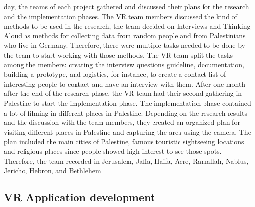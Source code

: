 day, the teams of each project gathered and discussed their plans for the research and the
implementation phases. The VR team members discussed the kind of methods to be used in
the research, the team decided on Interviews and Thinking Aloud as methods for collecting
data from random people and from Palestinians who live in Germany. Therefore, there were
multiple tasks needed to be done by the team to start working with those methods. The VR
team split the tasks among the members: creating the interview questions guideline,
documentation, building a prototype, and logistics, for instance, to create a contact list of
interesting people to contact and have an interview with them.
After one month after the end of the research phase, the VR team had their second gathering
in Palestine to start the implementation phase. The implementation phase contained a lot of
filming in different places in Palestine. Depending on the research results and the discussion
with the team members, they created an organized plan for visiting different places in
Palestine and capturing the area using the camera. The plan included the main cities of
Palestine, famous touristic sightseeing locations and religious places since people showed
high interest to see those spots. Therefore, the team recorded in Jerusalem, Jaffa, Haifa, Acre, Ramallah, Nablus, Jericho, Hebron, and Bethlehem.

\subsection{VR Application development}